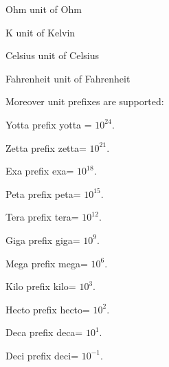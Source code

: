\begin{datadesc}{Ohm}
 unit of Ohm
\end{datadesc}
\begin{datadesc}{K}
unit of Kelvin 
\end{datadesc}
\begin{datadesc}{Celsius}
 unit of Celsius
\end{datadesc}

\begin{datadesc}{Fahrenheit}
unit of Fahrenheit 
\end{datadesc}

Moreover unit prefixes are supported:

\begin{datadesc}{Yotta}
prefix yotta = $10^{24}$.
 
\end{datadesc}

\begin{datadesc}{Zetta}
prefix zetta= $10^{21}$.
\end{datadesc}

\begin{datadesc}{Exa}
prefix exa= $10^{18}$.
 \end{datadesc}

\begin{datadesc}{Peta}
prefix peta= $10^{15}$.
 \end{datadesc}

\begin{datadesc}{Tera}
prefix tera= $10^{12}$.
 \end{datadesc}

\begin{datadesc}{Giga}
prefix giga= $10^9$.
 \end{datadesc}

\begin{datadesc}{Mega}
prefix mega= $10^6$.
 \end{datadesc}

\begin{datadesc}{Kilo}
prefix kilo= $10^3$.
 \end{datadesc}

\begin{datadesc}{Hecto}
prefix hecto= $10^2$.
 \end{datadesc}

\begin{datadesc}{Deca}
prefix deca= $10^1$.
 \end{datadesc}

\begin{datadesc}{Deci}
prefix deci= $10^{-1}$.
 \end{datadesc}

